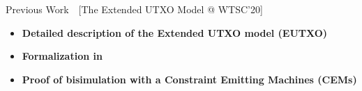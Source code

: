 \begin{frame}{Previous Work~~[The Extended UTXO Model @ WTSC'20]}
  \begin{itemize}
  \setlength\itemsep{.25cm}

  \item \textbf{Detailed description of the Extended UTXO model (EUTXO)}
  \begin{center}
  \scalebox{.7}{
    \begin{tikzpicture}
      \eutxo
    \end{tikzpicture}
  }
  \end{center}

  \item \textbf{Formalization in} \\

  \item \textbf{Proof of bisimulation with a Constraint Emitting Machines (CEMs)}\\
  \begin{center}
  \scalebox{.6}{
    \begin{tikzpicture}
      \multisig
    \end{tikzpicture}
  }
  \end{center}

  \end{itemize}
\end{frame}

